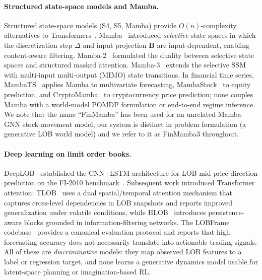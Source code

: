 \documentclass{article}
\begin{document}
\paragraph{Structured state-space models and Mamba.}
Structured state-space models (S4, S5, Mamba) provide
$O(n)$-complexity alternatives to
Transformers~\citep{gu2022efficiently, smith2023s5, gu2024mamba}.
Mamba~\citep{gu2024mamba} introduced \emph{selective} state spaces in
which the discretization step $\Delta$ and input projection
$\mathbf{B}$ are input-dependent, enabling content-aware filtering.
Mamba-2~\citep{dao2024mamba2} formulated the duality between selective
state spaces and structured masked attention.
Mamba-3~\citep{lahoti2026mamba3} extends the selective SSM with
multi-input multi-output (MIMO) state transitions.  In financial time
series, MambaTS~\citep{mambats2024} applies Mamba to multivariate
forecasting, MambaStock~\citep{mambastock2024} to equity prediction, and
CryptoMamba~\citep{sepehri2025cryptomamba} to cryptocurrency price
prediction; none couples Mamba with a world-model POMDP formulation or
end-to-end regime inference.  We note that the name ``FinMamba'' has been
used for an unrelated Mamba-GNN stock-movement model; our system is
distinct in problem formulation (a generative LOB world model) and we
refer to it as FinMamba3 throughout.

\paragraph{Deep learning on limit order books.}
DeepLOB~\citep{zhang2019deeplob} established the CNN+LSTM architecture
for LOB mid-price direction prediction on the FI-2010
benchmark~\citep{ntakaris2018benchmark}.  Subsequent work introduced
Transformer attention: TLOB~\citep{berti2025tlob} uses a dual
spatial/temporal attention mechanism that captures cross-level
dependencies in LOB snapshots and reports improved generalization under
volatile conditions, while HLOB~\citep{hlob2024} introduces
persistence-aware blocks grounded in information-filtering networks.
The LOBFrame codebase~\citep{lobframe2024} provides a canonical
evaluation protocol and reports that high forecasting accuracy does not
necessarily translate into actionable trading signals.  All of these are
\emph{discriminative} models: they map observed LOB features to a label
or regression target, and none learns a generative dynamics model usable
for latent-space planning or imagination-based RL.
\end{document}
